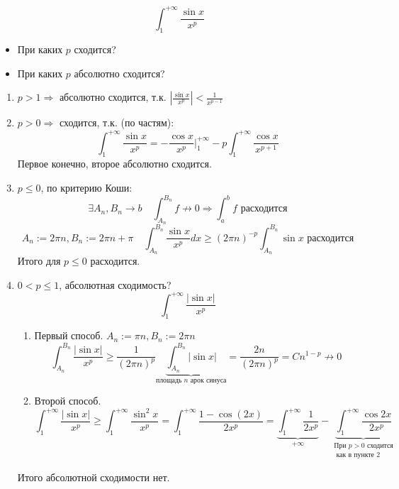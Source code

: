 \begin{example}
    $$\int_1^{+\infty} \frac{\sin x}{x^p}$$
    \begin{itemize}
        \item При каких $p$ сходится?
        \item При каких $p$ абсолютно сходится?
    \end{itemize}
    \begin{enumerate}
        \item $p > 1 \Rightarrow$ абсолютно сходится, т.к. $\left|\frac{\sin x}{x^p}\right|<\frac{1}{x^{p-1}}$
        \item $p > 0 \Rightarrow$ сходится, т.к. (по частям):
        $$\int_1^{+\infty} \frac{\sin x}{x^p} = -\frac{\cos x}{x^p}\bigg|_1^{+\infty} - p \int_1^{+\infty} \frac{\cos x}{x^{p+1}}$$
        Первое конечно, второе абсолютно сходится.
        \item $p \leq 0$, по критерию Коши:
        $$\exists A_n, B_n \to b \quad \int_{A_n}^{B_n} f\not\to0 \Rightarrow \int_a^b f \text{ расходится}$$
        $$A_n:=2\pi n, B_n:=2\pi n+\pi \quad \int_{A_n}^{B_n} \frac{\sin x}{x^p} dx \geq (2\pi n)^{-p}\int_{A_n}^{B_n} \sin x \text{ расходится}$$
        Итого для $p\leq 0$ расходится.
        \item $0<p\leq 1$, абсолютная сходимость?
        $$\int_1^{+\infty} \frac{|\sin x|}{x^p}$$
        \begin{enumerate}
            \item Первый способ. $A_n:=\pi n, B_n:=2\pi n$
            $$\int_{A_n}^{B_n}\frac{|\sin x|}{x^p} \ge \frac{1}{(2\pi n)^p}\underbrace{\int_{A_n}^{B_n}|\sin x|}_{\text{площадь } n \text{ арок синуса}}=\frac{2n}{(2\pi n)^p}=Cn^{1-p}\not\to0$$
            \item Второй способ.
            $$\int_1^{+\infty} \frac{|\sin x|}{x^p} \ge \int_1^{+\infty} \frac{\sin^2 x}{x^p} = \int_1^{+\infty} \frac{1-\cos(2x)}{2x^p} = \underbrace{\int_1^{+\infty} \frac{1}{2x^p}}_{+\infty} - \underbrace{\int_1^{+\infty} \frac{\cos 2x}{2x^p}}_{\substack{\text{При } p>0 \text{ сходится} \\ \text{ как в пункте 2}}}$$
        \end{enumerate}
        Итого абсолютной сходимости нет.
    \end{enumerate}
\end{example}

